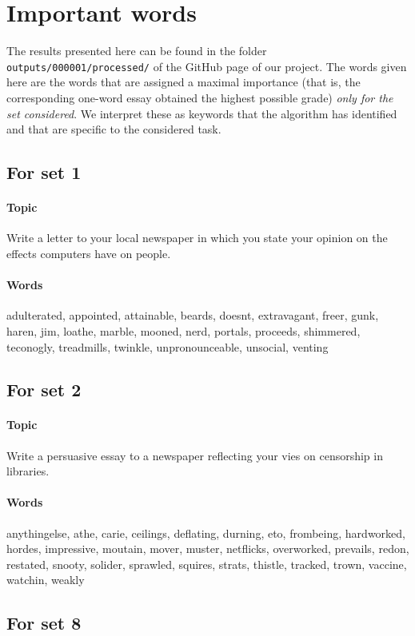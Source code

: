\documentclass[a4paper,12pt,english]{article}
\begin{document}
\appendix
\newpage
\section{Important words}
\label{pos:importantwords}
The results presented here can be found in the folder \verb+outputs/000001/processed/+ of the GitHub page of our project. The words given here are the words that are assigned a maximal importance (that is, the corresponding one-word essay obtained the highest possible grade) \emph{only for the set considered}. We interpret these as keywords that the algorithm has identified and that are specific to the considered task.
\subsection{For set 1}
\paragraph{Topic} Write a letter to your local newspaper in which you state your opinion on the effects computers have on people.
\paragraph{Words}
adulterated, appointed, attainable, beards, doesnt, extravagant, 
freer, gunk, haren, jim, loathe, marble, mooned, nerd, 
portals, proceeds, shimmered, teconogly, treadmills, twinkle, unpronounceable, unsocial, venting

\subsection{For set 2}
\paragraph{Topic} Write a persuasive essay to a newspaper reflecting your vies on censorship in libraries.

\paragraph{Words}
anythingelse, athe, carie, ceilings, deflating, durning, eto, frombeing, hardworked, hordes, impressive, moutain, mover, muster, netflicks, overworked, prevails, redon, restated, snooty, solider, sprawled, squires, strats, thistle, tracked, trown, vaccine, watchin, weakly

\subsection{For set 8}
\end{document}
